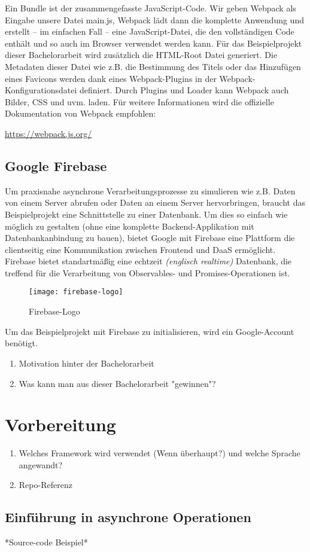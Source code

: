 Ein Bundle ist der zusammengefasste JavaScript-Code. Wir geben Webpack als Eingabe unsere Datei main.js, Webpack lädt dann die komplette Anwendung und erstellt – im einfachen Fall – eine JavaScript-Datei, die den vollständigen Code enthält und so auch im Browser verwendet werden kann.\cite{Webpack-basics}
Für das Beispielprojekt dieser Bachelorarbeit wird zusätzlich die HTML-Root Datei generiert. Die Metadaten dieser Datei wie z.B. die Bestimmung des Titels oder das Hinzufügen eines Favicons werden dank eines Webpack-Plugins in der Webpack-Konfigurationsdatei definiert. Durch Plugins und Loader kann Webpack auch Bilder, CSS und uvm. laden.
Für weitere Informationen wird die offizielle Dokumentation von Webpack empfohlen:

\begin{center}
\url{https://webpack.js.org/}
\end{center}

\subsection{Google Firebase}
Um praxisnahe asynchrone Verarbeitungsprozesse zu simulieren wie z.B. Daten von einem Server abrufen oder Daten an einem Server hervorbringen, braucht das Beispielprojekt eine Schnittstelle zu einer Datenbank. Um dies so einfach wie möglich zu gestalten (ohne eine komplette Backend-Applikation mit Datenbankanbindung zu bauen), bietet Google mit Firebase eine Plattform die clientseitig eine Kommunikation zwischen Frontend und DaaS ermöglicht. Firebase bietet standartmäßig eine echtzeit \textit{(englisch \glqq{}realtime\grqq{})} Datenbank, die treffend für die Verarbeitung von Observables- und Promises-Operationen ist.

\begin{figure}[H]
\centering
\texttt{[image: firebase-logo]}
\caption{Firebase-Logo\cite{firebase}}
\end{figure}

Um das Beispielprojekt mit Firebase zu initialisieren, wird ein Google-Account benötigt.


\begin{enumerate} 
\item Motivation hinter der Bachelorarbeit
\item Was kann man aus dieser Bachelorarbeit "gewinnen"?
\end{enumerate}

\section{Vorbereitung}
\begin{enumerate} 
\item Welches Framework wird verwendet (Wenn überhaupt?) und welche Sprache angewandt?
\item Repo-Referenz
\end{enumerate}

\subsection{Einführung in asynchrone Operationen}
*Source-code Beispiel*